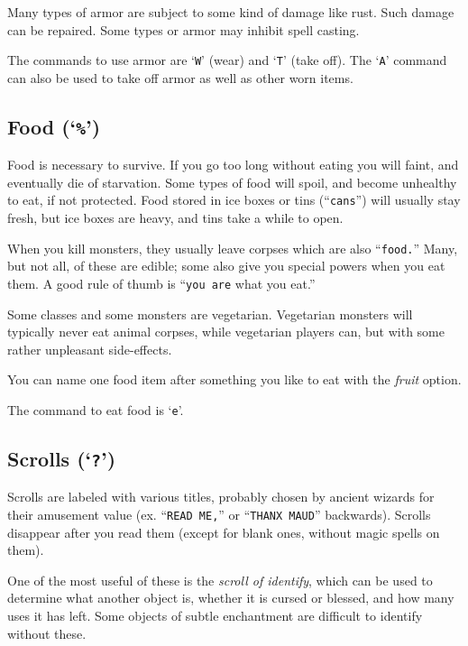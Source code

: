 Many types of armor are subject to some kind of damage like rust.  Such
damage can be repaired.  Some types or armor may inhibit spell casting.

The commands to use armor are `{\tt W}' (wear) and `{\tt T}' (take off).
The `{\tt A}' command can also be used to take off armor as well as other
worn items.
\subsection*{Food (`{\tt \%}')}


Food is necessary to survive.  If you go too long without eating you
will faint, and eventually die of starvation.  Some types of food will
spoil, and become unhealthy to eat, if not protected.  Food stored in
ice boxes or tins (``{\tt cans}'') will usually stay fresh, but
ice boxes are heavy, and tins take a while to open.

When you kill monsters, they usually leave corpses which are also
``{\tt food.}''  Many, but not all, of these are edible; some also give you
special powers when you eat them.  A good rule of thumb is ``{\tt you are}
what you eat.''

Some classes and some monsters are vegetarian.  Vegetarian monsters will
typically never eat animal corpses, while vegetarian players can, but with
some rather unpleasant side-effects.

You can name one food item after something you like to eat with the
{\it fruit\/} 
option.

The command to eat food is `{\tt e}'.
\subsection*{Scrolls (`{\tt ?}')}


Scrolls are labeled with various titles, probably chosen by ancient wizards
for their amusement value (ex. ``{\tt READ ME,}'' or ``{\tt THANX MAUD}'' backwards).
Scrolls disappear after you read them (except for blank ones, without
magic spells on them).

One of the most useful of these is the {\it scroll of identify}, which
can be used to determine what another object is, whether it is cursed or
blessed, and how many uses it has left.  Some objects of subtle
enchantment are difficult to identify without these.

